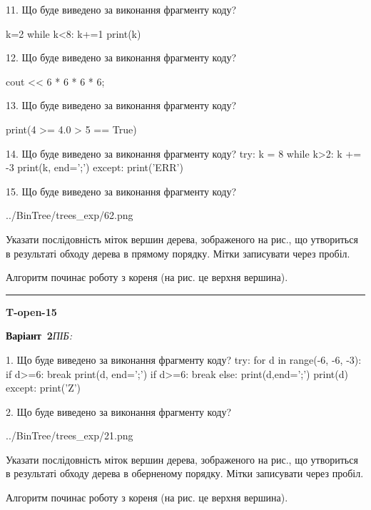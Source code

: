 \documentclass[11pt]{article}
\begin{document}
11. Що буде виведено за виконання фрагменту коду?

k=2
while k<8:
    k+=1
print(k)


12. Що буде виведено за виконання фрагменту коду?

cout << 6 * 6 * 6 * 6;

13. Що буде виведено за виконання фрагменту коду?

print(4 >= 4.0 > 5 == True)

14. Що буде виведено за виконання фрагменту коду?
try:
    k = 8
    while k>2:
        k += -3
    print(k, end=';')
except:
    print('ERR')

15. Що буде виведено за виконання фрагменту коду?

\begin{center}
	{../BinTree/trees_exp/62.png}
\end{center}
Указати послідовність міток вершин дерева, зображеного на рис., що утвориться в результаті обходу дерева в прямому порядку. Мітки записувати через пробіл.\par Алгоритм починає роботу з кореня (на рис. це верхня вершина).
















\vspace{10mm}
\noindent\rule{\textwidth}{0.3pt}
\vspace{8mm}
{\large\textbf{T-open-15}}

\textbf{Варіант \No\,2}\hfill \textit{ПІБ:}\,\underline{\hspace{60mm}}
\vspace{4mm}

1. Що буде виведено за виконання фрагменту коду?
try:
    for d in range(-6, -6, -3):
        if d>=6:
            break
        print(d, end=';')
        if d>=6:
            break
    else:
        print(d,end=';')
    print(d)
except:
    print('Z')

2. Що буде виведено за виконання фрагменту коду?

\begin{center}
	{../BinTree/trees_exp/21.png}
\end{center}
Указати послідовність міток вершин дерева, зображеного на рис., що утвориться в результаті обходу дерева в оберненому порядку. Мітки записувати через пробіл.\par Алгоритм починає роботу з кореня (на рис. це верхня вершина).
\end{document}
